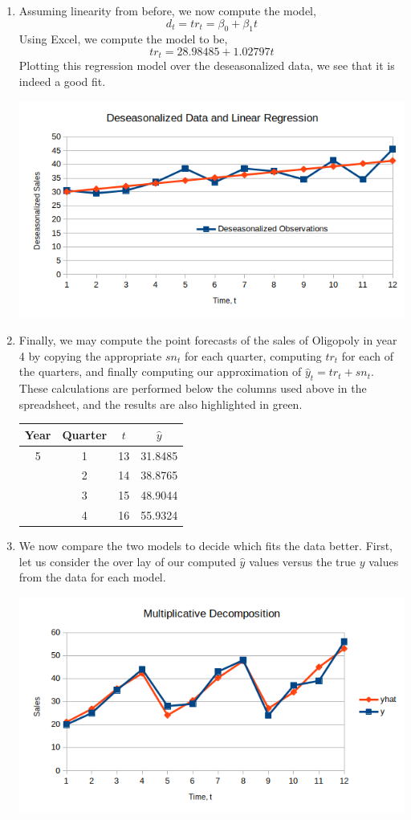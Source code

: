\documentclass[letterpaper,10pt]{article}
\begin{document}
\begin{enumerate}
\begin{enumerate}
\item Assuming linearity from before, we now compute the model,
\[d_t=tr_t=\beta_0+\beta_1t\]
Using Excel, we compute the model to be,
\[tr_t=28.98485+1.02797t\]
Plotting this regression model over the deseasonalized data, we see that it is indeed a good fit.
\begin{center}
\includegraphics[scale=0.8]{addregression.png}
\end{center}
\item Finally, we may compute the point forecasts of the sales of Oligopoly in year 4 by copying the appropriate $sn_t$ for each quarter, computing $tr_t$ for each of the quarters, and finally computing our approximation of $\hat{y}_t=tr_t + sn_t$. These calculations are performed below the columns used above in the spreadsheet, and the results are also highlighted in green.
\begin{center}
\begin{tabular}{|c|c|c|c|}
\hline
Year & Quarter & $t$ & $\hat{y}$ \\\hline
5 & 1 & 13 & 31.8485\\
& 2 & 14 & 38.8765\\
& 3 & 15 & 48.9044\\
& 4 & 16 & 55.9324\\\hline
\end{tabular}
\end{center}
\item We now compare the two models to decide which fits the data better. First, let us consider the over lay of our computed $\hat{y}$ values versus the true $y$ values from the data for each model.
\begin{center}
\includegraphics[scale=0.8]{multyhat.png}

\end{center}
\end{enumerate}
\end{enumerate}
\end{document}
